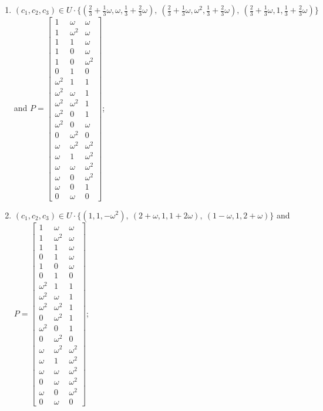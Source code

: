 \begin{enumerate}
\item[(f92)\,\newitem] $(c_1,c_2,c_3)\in U\cdot\{(\tfrac{2}{3}+\tfrac{1}{3}\omega,\omega,\tfrac{1}{3}+\tfrac{2}{3}\omega),\allowbreak\ (\tfrac{2}{3}+\tfrac{1}{3}\omega,\omega^2,\tfrac{1}{3}+\tfrac{2}{3}\omega),\allowbreak\ (\tfrac{2}{3}+\tfrac{1}{3}\omega,1,\tfrac{1}{3}+\tfrac{2}{3}\omega)\}$ and $P=\begin{bmatrix}1&\omega&\omega\\1&\omega^2&\omega\\1&1&\omega\\1&0&\omega\\1&0&\omega^2\\0&1&0\\\omega^2&1&1\\\omega^2&\omega&1\\\omega^2&\omega^2&1\\\omega^2&0&1\\\omega^2&0&\omega\\0&\omega^2&0\\\omega&\omega^2&\omega^2\\\omega&1&\omega^2\\\omega&\omega&\omega^2\\\omega&0&\omega^2\\\omega&0&1\\0&\omega&0\end{bmatrix}$;
\item[(f93)\,\newitem] $(c_1,c_2,c_3)\in U\cdot\{(1,1,-\omega^2),\allowbreak\ (2+\omega,1,1+2\omega),\allowbreak\ (1-\omega,1,2+\omega)\}$ and $P=\begin{bmatrix}1&\omega&\omega\\1&\omega^2&\omega\\1&1&\omega\\0&1&\omega\\1&0&\omega\\0&1&0\\\omega^2&1&1\\\omega^2&\omega&1\\\omega^2&\omega^2&1\\0&\omega^2&1\\\omega^2&0&1\\0&\omega^2&0\\\omega&\omega^2&\omega^2\\\omega&1&\omega^2\\\omega&\omega&\omega^2\\0&\omega&\omega^2\\\omega&0&\omega^2\\0&\omega&0\end{bmatrix}$;

\end{enumerate}
